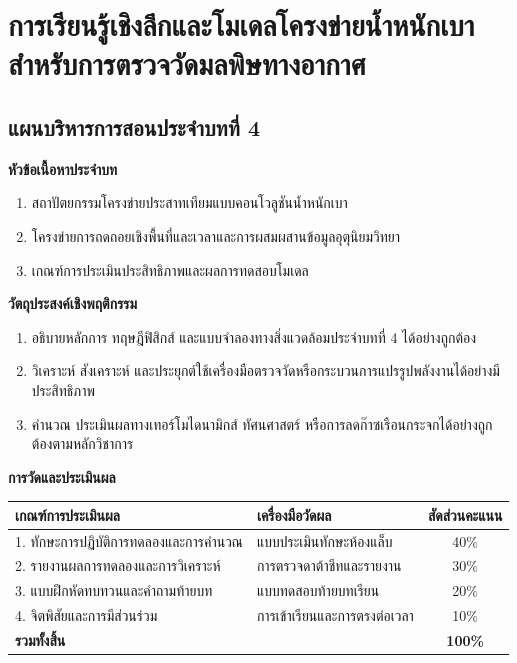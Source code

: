\chapter{การเรียนรู้เชิงลึกและโมเดลโครงข่ายน้ำหนักเบาสำหรับการตรวจวัดมลพิษทางอากาศ}
\label{chap:ch04}

\section*{แผนบริหารการสอนประจำบทที่ 4}

\noindent\textbf{หัวข้อเนื้อหาประจำบท}
\begin{enumerate}
    \item สถาปัตยกรรมโครงข่ายประสาทเทียมแบบคอนโวลูชันน้ำหนักเบา
    \item โครงข่ายการถดถอยเชิงพื้นที่และเวลาและการผสมผสานข้อมูลอุตุนิยมวิทยา
    \item เกณฑ์การประเมินประสิทธิภาพและผลการทดสอบโมเดล
\end{enumerate}

\noindent\textbf{วัตถุประสงค์เชิงพฤติกรรม}
\begin{enumerate}
    \item อธิบายหลักการ ทฤษฎีฟิสิกส์ และแบบจำลองทางสิ่งแวดล้อมประจำบทที่ 4 ได้อย่างถูกต้อง
    \item วิเคราะห์ สังเคราะห์ และประยุกต์ใช้เครื่องมือตรวจวัดหรือกระบวนการแปรรูปพลังงานได้อย่างมีประสิทธิภาพ
    \item คำนวณ ประเมินผลทางเทอร์โมไดนามิกส์ ทัศนศาสตร์ หรือการลดก๊าซเรือนกระจกได้อย่างถูกต้องตามหลักวิชาการ
\end{enumerate}

\noindent\textbf{การวัดและประเมินผล}
\begin{table}[H]
\centering\small
\begin{tabularx}{\textwidth}{p{} p{} c}
\toprule
\textbf{เกณฑ์การประเมินผล} & \textbf{เครื่องมือวัดผล} & \textbf{สัดส่วนคะแนน} \\
\midrule
1. ทักษะการปฏิบัติการทดลองและการคำนวณ & แบบประเมินทักษะห้องแล็บ & 40\% \\
2. รายงานผลการทดลองและการวิเคราะห์ & การตรวจดาต้าชีทและรายงาน & 30\% \\
3. แบบฝึกหัดทบทวนและคำถามท้ายบท & แบบทดสอบท้ายบทเรียน & 20\% \\
4. จิตพิสัยและการมีส่วนร่วม & การเข้าเรียนและการตรงต่อเวลา & 10\% \\
\midrule
\textbf{รวมทั้งสิ้น} & & \textbf{100\%} \\
\bottomrule
\end{tabularx}
\end{table}
\newpage

